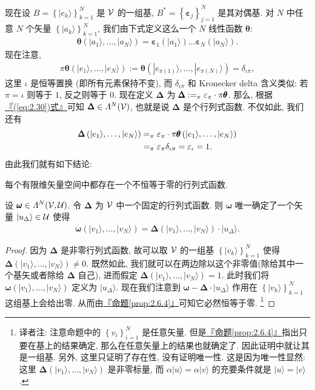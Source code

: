 \documentclass[lang=cn,zihao=-4,twoside,fontset=none]{textbook}
\let\sum\relax
\def\eq#1{\[\begin{aligned}{}#1\end{aligned}\]}
\newcommand{\qt}[1]{\left( #1 \right)}
\newcommand{\bepsilon}{{\pmb{\varepsilon}}}
\newcommand{\btheta}{{\pmb{\theta}}}
\newcommand{\bomega}{{\pmb{\omega}}}
\newcommand{\BDelta}{{\pmb{\Delta}}}
\renewcommand{\eqref}[1]{\hyperref[#1]{『\textnormal{(\ref*{#1})}式』}}
\newcommand{\propref}[1]{\hyperref[#1]{『命题\textnormal{\ref*{#1}}』}}
\newcommand{\Set}[1]{\left\{#1\right\}}
\newcommand{\vlist}[2]{\ket{#1_1},\dots,\ket{#1_{#2}}}
\renewcommand{\ket}[1]{| #1 \rangle}
\begin{document}
现在设 $B=\Set{\ket{e_k}}_{k=1}^N$ 是 ${\mathcal V}$ 的一组基, $B^*=\Set{\bepsilon_j}_{j=1}^N$ 是其对偶基. 对 $N$ 中任意 $N$ 个矢量 $\Set{\ket{a_k}}_{k=1}^N$, 我们由下式定义这么一个 $N$ 线性函数 $\btheta$:
\eq{
    \btheta\qt{\ket{a_1},\dots,\ket{a_N}}=\bepsilon_1(\ket{a_1})\dots\bepsilon_N\qt{\ket{a_N}}.
}
现在注意,
\eq{
    \pi\btheta\qt{\vlist{e}{N}}:=\btheta\qt{\ket{e_{\pi(1)}},\dots,\ket{e_{\pi(N)}}}=\delta_{\iota\pi},
}
这里 $\iota$ 是恒等置换 (即所有元素保持不变), 而 $\delta_{\iota\pi}$ 和 Kronecker delta 含义类似: 若 $\pi=\iota$ 则等于 $1$, 反之则等于 $0$. 现在定义 $\BDelta$ 为 $\BDelta:=\sum_\pi\varepsilon_\pi\cdot\pi\btheta$. 那么, 根据\eqref{eq:2.30}可知 $\BDelta\in\varLambda^N(\mV)$, 也就是说 $\BDelta$ 是个行列式函数. 不仅如此, 我们还有 
\eq{
    \BDelta\qt{\vlist{e }{N}}&=\sum_\pi\varepsilon_\pi \cdot \pi \btheta \qt{\vlist{e}{N}}\\
    &=\sum_\pi\varepsilon_\pi \delta_{\iota\pi}=\varepsilon_{\iota}=1.
}
由此我们就有如下结论:

\begin{summary}
    \label{sum:2.6.6}%
    每个有限维矢量空间中都存在一个不恒等于零的行列式函数. 
\end{summary}

\begin{prop}
    \label{prop:2.6.7}%
    设 $\bomega\in\varLambda^N(\mV,\mU)$. 令 $\BDelta$ 为 ${\mathcal V}$ 中一个固定的行列式函数. 则 $\bomega$ 唯一确定了一个矢量 $\ket{u_\Delta}\in\mU$ 使得
    \eq{
        \bomega\qt{\vlist{v}{N}}=\BDelta\qt{\vlist{v }{N}}\cdot \ket{u_\Delta}.
    }
\end{prop}

\begin{proof}
    因为 $\BDelta$ 是非零行列式函数, 故可以取 ${\mathcal V}$ 的一组基 $\Set{\ket{v_k}}_{k=1}^N$ 使得 $\BDelta\qt{\vlist{v }{N}}\neq 0$. 既然如此, 我们就可以在两边除以这个非零值(除给其中一个基矢或者除给 $\BDelta$ 自己), 进而假定 $\BDelta\qt{\vlist{v }{N}}=1$. 此时我们将 $\bomega\qt{\vlist{v }{N}}$ 定义为 $\ket{u_\Delta}$. 现在我们注意到 $\bomega-\BDelta\cdot\ket{u_\Delta}$ 作用在 $\Set{\ket{v_k}}_{k=1}^N$ 这组基上会给出零. 从而由\propref{prop:2.6.4}可知它必然恒等于零. \footnote{译者注: 注意命题中的 $\Set{v_i}_{i=1}^N$ 是任意矢量. 但是\propref{prop:2.6.4}指出只要在基上的结果确定, 那么在任意矢量上的结果也就确定了. 因此证明中就让其是一组基. 另外, 这里只证明了存在性, 没有证明唯一性. 这是因为唯一性显然: 这里 $\BDelta\qt{\vlist{v}{N}}$ 是非零标量, 而 $\alpha\ket{u}=\alpha\ket{v}$ 的充要条件就是 $\ket{u}=\ket{v}$.} 
\end{proof}
\end{document}

